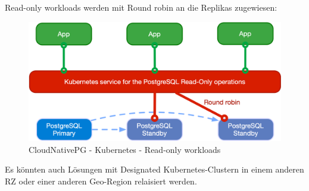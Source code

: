 \begin{flushleft}
    Read-only workloads werden mit Round robin an die Replikas zugewiesen:
    \begin{figure}[H]
        \centering
        \includegraphics[width=0.75\linewidth]{source/implementation/evaluation/postgresql_ha_solutions/cloudnativepg/cloudnativepg-architecture-read-only}
        \caption{CloudNativePG - Kubernetes - Read-only workloads}
        \label{fig:cloudnativepg-architecture-read-only}
    \end{figure}
\end{flushleft}
\begin{flushleft}
    Es könnten auch Lösungen mit Designated Kubernetes-Clustern in einem anderen RZ oder einer anderen Geo-Region relaisiert werden.
\end{flushleft}
